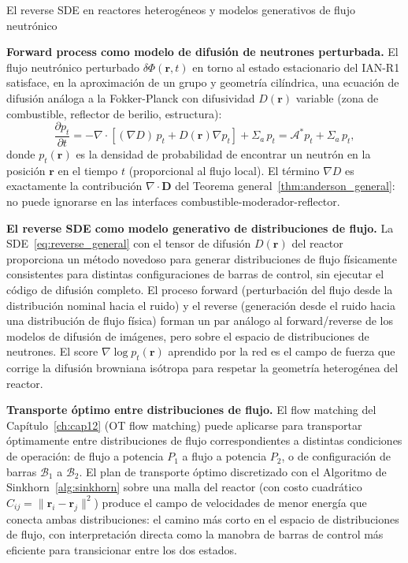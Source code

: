 \label{sec:estrella11}
\begin{estrella}{El reverse SDE en reactores heterogéneos y modelos generativos de flujo neutrónico}

\textbf{Forward process como modelo de difusión de neutrones perturbada.}
El flujo neutrónico perturbado $\delta\Phi(\bm{r},t)$ en torno al estado
estacionario del IAN-R1 satisface, en la aproximación de un grupo y geometría
cilíndrica, una ecuación de difusión análoga a la Fokker-Planck con difusividad
$D(\bm{r})$ variable (zona de combustible, reflector de berilio, estructura):
\[
  \frac{\partial p_t}{\partial t}
  = -\nabla\cdot\!\left[(\nabla D)\,p_t + D(\bm{r})\nabla p_t\right]
  + \Sigma_a\,p_t = \mathcal{A}^*p_t + \Sigma_a\,p_t,
\]
donde $p_t(\bm{r})$ es la densidad de probabilidad de encontrar un neutrón en
la posición $\bm{r}$ en el tiempo $t$ (proporcional al flujo local). El término
$\nabla D$ es exactamente la contribución $\nabla\cdot\bm{D}$ del Teorema
general~\ref{thm:anderson_general}: no puede ignorarse en las interfaces
combustible-moderador-reflector.\medskip

\textbf{El reverse SDE como modelo generativo de distribuciones de flujo.}
La SDE~\eqref{eq:reverse_general} con el tensor de difusión $D(\bm{r})$ del
reactor proporciona un método novedoso para generar distribuciones de flujo
físicamente consistentes para distintas configuraciones de barras de control,
sin ejecutar el código de difusión completo. El proceso forward (perturbación
del flujo desde la distribución nominal hacia el ruido) y el reverse (generación
desde el ruido hacia una distribución de flujo física) forman un par análogo al
forward/reverse de los modelos de difusión de imágenes, pero sobre el espacio
de distribuciones de neutrones. El score $\nabla\log p_t(\bm{r})$ aprendido
por la red es el campo de fuerza que corrige la difusión browniana isótropa para
respetar la geometría heterogénea del reactor.\medskip

\textbf{Transporte óptimo entre distribuciones de flujo.}
El flow matching del Capítulo~\ref{ch:cap12} (OT flow matching) puede
aplicarse para transportar óptimamente entre distribuciones de flujo
correspondientes a distintas condiciones de operación: de flujo a potencia
$P_1$ a flujo a potencia $P_2$, o de configuración de barras $\mathcal{B}_1$
a $\mathcal{B}_2$. El plan de transporte óptimo discretizado con el Algoritmo
de Sinkhorn~\ref{alg:sinkhorn} sobre una malla del reactor (con costo
cuadrático $C_{ij} = \|\bm{r}_i - \bm{r}_j\|^2$) produce el campo de
velocidades de menor energía que conecta ambas distribuciones: el camino
más corto en el espacio de distribuciones de flujo, con interpretación directa
como la manobra de barras de control más eficiente para transicionar entre
los dos estados.


\end{estrella}
